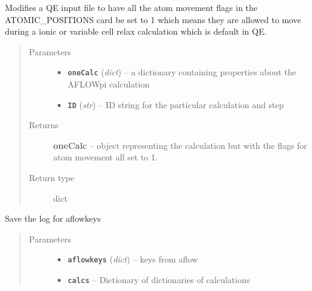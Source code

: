 \documentclass[letterpaper,10pt,english]{sphinxmanual}
\begin{document}
\begin{fulllineitems}
\label{prep:prep.__unfreezeAtoms}
Modifies a QE input file to have all the atom movement flags in the ATOMIC\_POSITIONS
card be set to 1 which means they are allowed to move during a ionic or variable cell
relax calculation which is default in QE.
\begin{quote}\begin{description}
\item[{Parameters}] \leavevmode\begin{itemize}
\item {} 
\textbf{\texttt{oneCalc}} (\emph{dict}) -- a dictionary containing properties about the AFLOWpi calculation

\item {} 
\textbf{\texttt{ID}} (\emph{str}) -- ID string for the particular calculation and step

\end{itemize}

\item[{Returns}] \leavevmode
\textbf{oneCalc} --
object representing the calculation but with the flags for atom
movement all set to 1.

\item[{Return type}] \leavevmode
dict

\end{description}\end{quote}

\end{fulllineitems}


\begin{fulllineitems}
\label{prep:prep.__updatecalclogs}
Save the log for aflowkeys
\begin{quote}\begin{description}
\item[{Parameters}] \leavevmode\begin{itemize}
\item {} 
\textbf{\texttt{aflowkeys}} (\emph{dict}) -- keys from aflow

\item {} 
\textbf{\texttt{calcs}} -- Dictionary of dictionaries of calculations

\end{itemize}

\end{description}\end{quote}

\end{fulllineitems}
\end{document}
